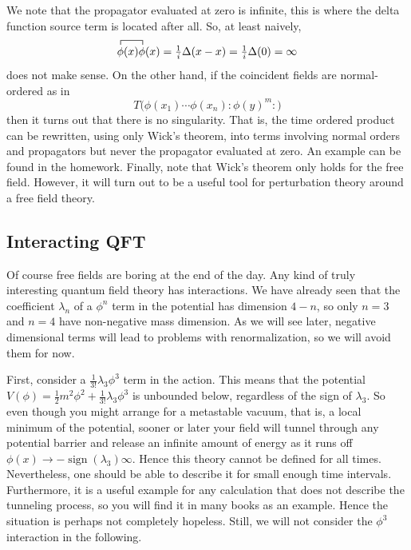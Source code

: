 \documentclass[12pt]{article}
\begin{document}
We note that the propagator evaluated at zero is infinite, this is
where the delta function source term is located after all. So, at
least naively,
\begin{equation}
  \contraction{}{\phi}{(x)}{\phi}{}\phi(x) \phi(x) =
  \tfrac{1}{i} \Delta(x-x) =
  \tfrac{1}{i} \Delta(0) = \infty
\end{equation}
does not make sense. On the other hand, if the coincident fields are
normal-ordered as in 
\begin{equation}
  T\big(\phi(x_1) \cdots \phi(x_n) :\phi(y)^m:\big)
\end{equation}
then it turns out that there is no singularity. That is, the time
ordered product can be rewritten, using only Wick's theorem, into
terms involving normal orders and propagators but never the propagator
evaluated at zero. An example can be found in the homework. Finally,
note that Wick's theorem only holds for the free field. However, it
will turn out to be a useful tool for perturbation theory around a
free field theory.

\subsection{Interacting QFT}

Of course free fields are boring at the end of the day. Any kind of
truly interesting quantum field theory has interactions. We have
already seen that the coefficient $\lambda_n$ of a $\phi^n$ term in
the potential has dimension $4-n$, so only $n=3$ and $n=4$ have
non-negative mass dimension. As we will see later, negative
dimensional terms will lead to problems with renormalization, so we
will avoid them for now.

First, consider a $\tfrac{1}{3!}\lambda_3 \phi^3$ term in the
action. This means that the potential $V(\phi) = \tfrac{1}{2} m^2
\phi^2 + \tfrac{1}{3!}\lambda_3 \phi^3$ is unbounded below, regardless
of the sign of $\lambda_3$. So even though you might arrange for a
metastable vacuum, that is, a local minimum of the potential, sooner
or later your field will tunnel through any potential barrier and
release an infinite amount of energy as it runs off $\phi(x)\to
-\mathop{\mathrm{sign}}(\lambda_3)\infty$. Hence this theory cannot be
defined for all times. Nevertheless, one should be able to describe it
for small enough time intervals. Furthermore, it is a useful example
for any calculation that does not describe the tunneling process, so
you will find it in many books as an example. Hence the situation is
perhaps not completely hopeless. Still, we will not consider the
$\phi^3$ interaction in the following.
\end{document}
